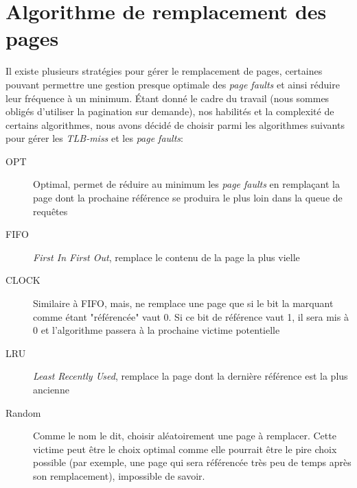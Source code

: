 \documentclass{article}
\begin{document}
\section{Algorithme de remplacement des pages}
\setlength{\parindent}{20pt}
Il existe plusieurs stratégies pour gérer le remplacement de pages, certaines pouvant permettre une gestion presque optimale des 
\emph{page faults} et ainsi réduire leur fréquence à un minimum. Étant donné le cadre du travail (nous sommes obligés d'utiliser la pagination 
sur demande), nos habilités et la complexité de certains algorithmes, nous avons décidé de choisir parmi les algorithmes suivants pour gérer les 
\emph{TLB-miss} et les \emph{page faults}:\\
\begin{description}
    \item [OPT] Optimal, permet de réduire au minimum les \emph{page faults} en remplaçant la page dont la prochaine référence se produira le 
    plus loin dans la queue de requêtes
    \item [FIFO] \emph{First In First Out}, remplace le contenu de la page la plus vielle
    \item [CLOCK] Similaire à FIFO, mais, ne remplace une page que si le bit la marquant comme étant "référencée" vaut 0. 
    Si ce bit de référence vaut 1, il sera mis à 0 et l'algorithme passera à la prochaine victime potentielle
    \item [LRU] \emph{Least Recently Used}, remplace la page dont la dernière référence est la plus ancienne
    \item [Random] Comme le nom le dit, choisir aléatoirement une page à remplacer. Cette victime peut être le choix optimal comme elle pourrait 
    être le pire choix possible (par exemple, une page qui sera référencée très peu de temps après son remplacement), impossible de savoir.
\end{description}
\end{document}
